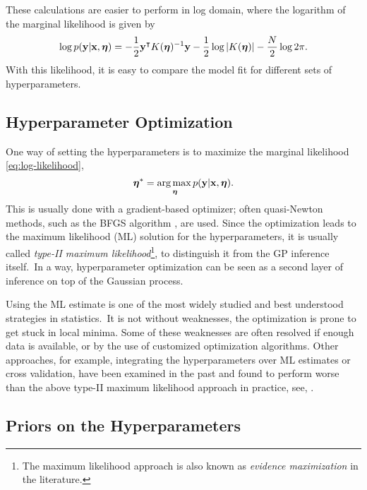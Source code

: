 These calculations are easier to perform in log domain,
where the logarithm of the marginal likelihood is given by
\begin{equation}
\label{eq:log-likelihood}
  \log p(\mathbf{y} | \mathbf{x},\boldsymbol{\eta}) = - \frac{1}{2} \mathbf{y}\T
  K(\boldsymbol{\eta})\inv
  \mathbf{y} - \frac{1}{2} \log \left|K(\boldsymbol{\eta})\right| -\frac{N}{2}
  \log 2\pi.
\end{equation}
With this likelihood, it is easy to compare the model fit for different sets of
hyperparameters.

\subsection{Hyperparameter Optimization}
\label{sec:typeII-ML}

One way of setting the hyperparameters is to maximize the marginal likelihood
\eqref{eq:log-likelihood},
\begin{equation}
  \boldsymbol{\eta}^* = \underset{\boldsymbol{\eta}}{\operatorname*{arg\,max\,}}
p(\mathbf{y}|\mathbf{x},\boldsymbol{\eta}).
\end{equation}
This is usually done with a gradient-based optimizer;
often quasi-Newton methods, such as the BFGS algorithm
%
, are used. Since the
optimization leads to the maximum likelihood (ML) solution for the
hyperparameters, it is usually called \emph{type-II maximum
likelihood}\footnote{The maximum likelihood approach is also known as
\emph{evidence maximization} in the literature.}, to distinguish it from the GP
inference itself.~\cite[.1]{Rasmussen.Williams:2006:Gaussian}\iss In a way, hyperparameter
optimization can be seen as a second layer of inference on top of the
Gaussian process.

Using the ML estimate is one of the most widely studied and best understood
strategies in statistics.~\cite[ -- ]{Wasserman:2010:All}\iss It is
not without weaknesses, \eg the optimization is prone to get stuck in local
minima. Some of these weaknesses are often resolved if enough data is available,
or by the use of customized optimization algorithms. Other approaches, for
example, integrating the hyperparameters over ML estimates or cross validation,
have been examined in the past and found to perform worse than the above type-II
maximum likelihood approach in practice, see, \eg \cite{MacKay:1999:Comparison}.

\subsection{Priors on the Hyperparameters}
\label{sec:typeII-MAP}

